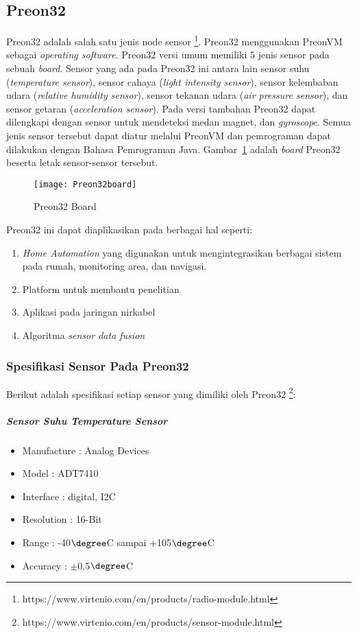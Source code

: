 \subsection{Preon32}
Preon32 adalah salah satu jenis node sensor \footnote{https://www.virtenio.com/en/products/radio-module.html}. Preon32 menggunakan PreonVM sebagai \textit{operating software}. Preon32 versi umum memiliki 5 jenis sensor pada sebuah \textit{board}. Sensor yang ada pada Preon32 ini antara lain sensor suhu (\textit{temperature sensor}), sensor cahaya (\textit{light intensity sensor}), sensor kelembaban udara (\textit{relative humidity sensor}), sensor tekanan udara (\textit{air pressure sensor}), dan sensor getaran (\textit{acceleration sensor}). Pada versi tambahan Preon32 dapat dilengkapi dengan sensor untuk mendeteksi medan magnet, dan \textit{gyroscope}. Semua jenis sensor tersebut dapat diatur melalui PreonVM dan pemrograman dapat dilakukan dengan Bahasa Pemrograman Java. Gambar~\ref{fig:Preon32board} adalah \textit{board} Preon32 beserta letak sensor-sensor tersebut.
\begin{figure} [H]
	\centering  
	\texttt{[image: Preon32board]}  
	\caption[Preon32 Board]{Preon32 Board} 
	\label{fig:Preon32board} 
\end{figure} 

Preon32 ini dapat diaplikasikan pada berbagai hal seperti:
\begin{enumerate}
	\item \textit{Home Automation} yang digunakan untuk mengintegrasikan berbagai sistem pada rumah, monitoring area, dan navigasi.  
	\item Platform untuk membantu penelitian
	\item Aplikasi pada jaringan nirkabel
	\item Algoritma \textit{sensor data fusion}
\end{enumerate}

\subsubsection{Spesifikasi Sensor Pada Preon32}
Berikut adalah spesifikasi setiap sensor yang dimiliki oleh Preon32 \footnote{https://www.virtenio.com/en/products/sensor-module.html}:
\subparagraph{Sensor Suhu \textit{Temperature Sensor}}
\begin{itemize}
    \item Manufacture : Analog Devices
    \item Model : ADT7410
    \item Interface : digital, I2C
    \item Resolution : 16-Bit
    \item Range : -40$\degree$C sampai +105$\degree$C
    \item Accuracy : $\pm$0.5$\degree$C
\end{itemize}

